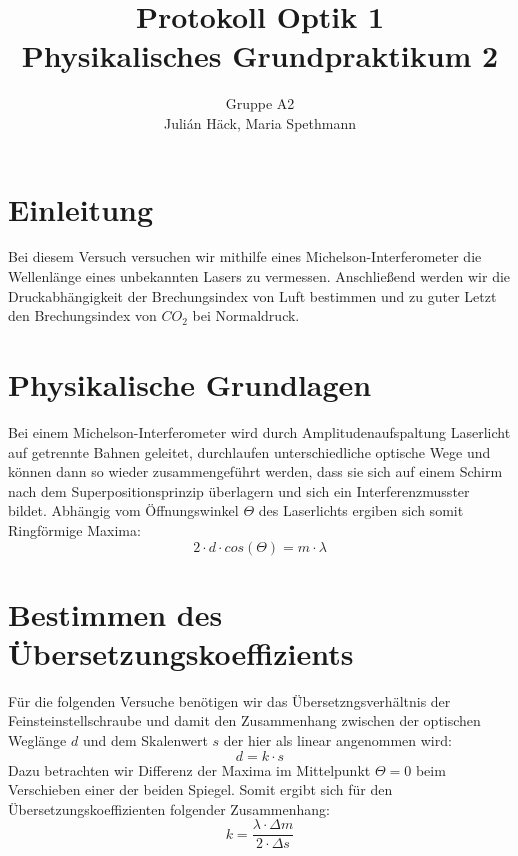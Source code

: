 \documentclass[12pt,a4paper]{article}
\author{Gruppe A2 \\ Julián Häck, Maria Spethmann}
\title{Protokoll Optik 1 \\ Physikalisches Grundpraktikum 2}
\begin{document}
	\maketitle
	\thispagestyle{empty} %
	\newpage
	\pagestyle{headings} %
	\tableofcontents
	\newpage


\section{Einleitung}
Bei diesem Versuch versuchen wir mithilfe eines Michelson-Interferometer die Wellenlänge eines unbekannten Lasers zu vermessen. Anschließend werden wir die Druckabhängigkeit der Brechungsindex von Luft bestimmen und zu guter Letzt den Brechungsindex von $CO_2$ bei Normaldruck.
\section{Physikalische Grundlagen} 
Bei einem Michelson-Interferometer wird durch Amplitudenaufspaltung Laserlicht auf getrennte Bahnen geleitet, durchlaufen unterschiedliche optische Wege und können dann so wieder zusammengeführt werden, dass sie sich auf einem Schirm nach dem Superpositionsprinzip überlagern und sich ein Interferenzmusster bildet.
Abhängig vom Öffnungswinkel $\Theta$ des Laserlichts ergiben sich somit Ringförmige Maxima:
\begin{equation}
2\cdot d\cdot cos(\Theta)=m\cdot \lambda
\end{equation}
\section{Bestimmen des Übersetzungskoeffizients}
Für die folgenden Versuche benötigen wir das Übersetzngsverhältnis der Feinsteinstellschraube und damit den Zusammenhang zwischen der optischen Weglänge $d$ und dem Skalenwert $s$ der hier als linear angenommen wird:
\begin{equation}
d=k\cdot s
\end{equation}
Dazu betrachten wir Differenz der Maxima im Mittelpunkt $\Theta = 0$ beim Verschieben einer der beiden Spiegel. Somit ergibt sich für den Übersetzungskoeffizienten folgender Zusammenhang:
\begin{equation}
k = \frac{\lambda \cdot \Delta m}{2\cdot \Delta s}
\end{equation}
\end{document}
